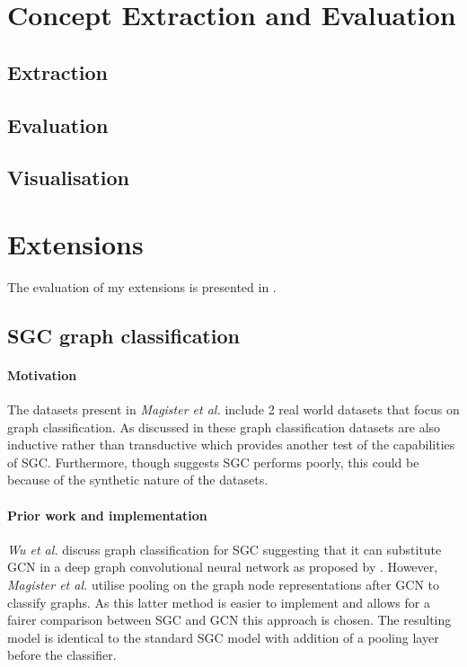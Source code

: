 \section{Concept Extraction and Evaluation}

\subsection{Extraction}

\subsection{Evaluation}

\subsection{Visualisation}

\section{Extensions}
The evaluation of my extensions is presented in .

\subsection{SGC graph classification}
\paragraph{Motivation}
The datasets present in \textit{Magister et al.}\cite{magister2021gcexplainer} include 2 real world datasets that focus on graph classification.
As discussed in  these graph classification datasets are also inductive rather than transductive which provides another test of the capabilities of SGC.
Furthermore, though  suggests SGC performs poorly, this could be because of the synthetic nature of the datasets.

\paragraph{Prior work and implementation}
\textit{Wu et al.}\cite{wu2019simplifying} discuss graph classification for SGC suggesting that it can substitute GCN in a deep graph convolutional neural network as proposed by .
However, \textit{Magister et al.} utilise pooling on the graph node representations after GCN to classify graphs. As this latter method is easier to implement and allows for a fairer comparison between SGC and GCN this approach is chosen.
The resulting model is identical to the standard SGC model with addition of a pooling layer before the classifier.

